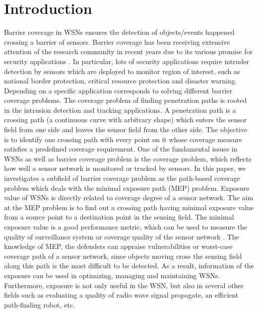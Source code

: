 \documentclass[final]{elsarticle}
\begin{document}
\section{Introduction}
Barrier coverage in WSNs ensures the detection of objects/events happened crossing a barrier of sensors. Barrier coverage has been receiving extensive attention of the research community in recent years due to its various promise for security applications \cite{wu2016survey,wang2011coverage,b15}. In particular, lots of security applications require intruder detection by sensors which are deployed to monitor region of interest, such as national border protection, critical resource protection and disaster warning. Depending on a specific application corresponds to solving different barrier coverage problems. The coverage problem of finding penetration paths is rooted in the intrusion detection and tracking applications. A penetration path is a crossing path (a continuous curve with arbitrary shape) which enters the sensor field from one side and leaves the sensor field from the other side. The objective is to identify one crossing path with every point on it whose coverage measure satisfies a predefined coverage requirement. One of the fundamental issues in WSNs as well as barrier coverage problem is the coverage problem, which reflects how well a sensor network is monitored or tracked by sensors. In this paper, we investigates a subfield of barrier coverage problem as the path-based coverage problem which deals with the minimal exposure path (MEP) problem. Exposure value of WSNs is directly related to coverage degree of a sensor network. The aim at the MEP problem is to find out a crossing path having minimal exposure value from a source point to a destination point in the sensing field. The minimal exposure value is a good performance metric, which can be used to measure the quality of surveillance system or coverage quality of the sensor network \cite{b13,b17}. The knowledge of MEP, the defenders can appraise vulnerabilities or worst-case coverage path of a sensor network, since objects moving cross the sensing field along this path is the most difficult to be detected. As a result, information of the exposure can be used in optimizing, managing and maintaining WSNs. Furthermore, exposure is not only useful in the WSN, but also in several other fields such as evaluating a quality of radio wave signal propagate, an efficient path-finding robot, etc.
\end{document}
